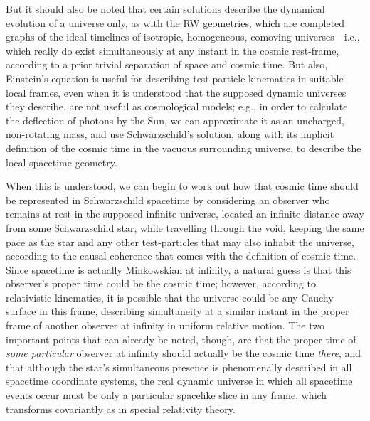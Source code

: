 But it should also be noted that certain solutions describe the dynamical evolution of a universe only, as with the RW geometries, which are completed graphs of the ideal timelines of isotropic, homogeneous, comoving universes---i.e., which really do exist simultaneously at any instant in the cosmic rest-frame, according to a prior trivial separation of space and cosmic time. But also, Einstein's equation is useful for describing test-particle kinematics in suitable local frames, even when it is understood that the supposed dynamic universes they describe, are not useful as cosmological models; e.g., in order to calculate the deflection of photons by the Sun, we can approximate it as an uncharged, non-rotating mass, and use Schwarzschild's solution, along with its implicit definition of the cosmic time in the vacuous surrounding universe, to describe the local spacetime geometry.

When this is understood, we can begin to work out how that cosmic time should be represented in Schwarzschild spacetime by considering an observer who remains at rest in the supposed infinite universe, located an infinite distance away from some Schwarzschild star, while travelling through the void, keeping the same pace as the star and any other test-particles that may also inhabit the universe, according to the causal coherence that comes with the definition of cosmic time. Since spacetime is actually Minkowskian at infinity, a natural guess is that this observer's proper time could be the cosmic time; however, according to relativistic kinematics, it is possible that the universe could be any Cauchy surface in this frame, describing simultaneity at a similar instant in the proper frame of another observer at infinity in uniform relative motion. The two important points that can already be noted, though, are that the proper time of \textit{some particular} observer at infinity should actually be the cosmic time \textit{there}, and that although the star's simultaneous presence is phenomenally described in all spacetime coordinate systems, the real dynamic universe in which all spacetime events occur must be only a particular spacelike slice in any frame, which transforms covariantly as in special relativity theory. 

